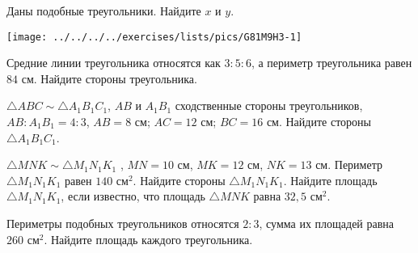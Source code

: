 \begin{homework}[number=3]
	\begin{listofex}
		\item 
		\begin{minipage}[t]{\bodywidth}
			Даны подобные треугольники. Найдите \( x \) и \( y \).
		\end{minipage}
		\hspace{0.02\linewidth}
		\begin{minipage}[t]{\picwidth}
			\texttt{[image: ../../../../exercises/lists/pics/G81M9H3-1]}
		\end{minipage}
		\item Средние линии треугольника относятся как \( 3 : 5 : 6 \), а периметр треугольника равен \( 84 \) см. Найдите стороны треугольника.
		\item \( \triangle ABC \sim \triangle A_1B_1C_1 \), \( AB \) и \( A_1B_1  \) сходственные стороны треугольников, \( AB:A_1B_1=4:3 \), \( AB=8 \) см; \( AC=12 \) см; \( BC=16 \) см. Найдите стороны \( \triangle A_1B_1C_1 \).
		\item \( \triangle MNK \sim \triangle M_1N_1K_1 \) , \( MN=10 \) см, \( MK=12 \) см, \( NK=13 \) см. Периметр \( \triangle M_1N_1K_1 \) равен \( 140 \) см\( ^{2} \). Найдите стороны \( \triangle M_1N_1K_1 \). Найдите площадь \( \triangle M_1N_1K_1 \), если известно, что площадь \( \triangle MNK \) равна \( 32,5 \) см\( ^{2} \).
		\item Периметры подобных треугольников относятся \( 2:3 \), сумма их площадей равна \( 260  \) см\( ^{2} \). Найдите площадь каждого треугольника.
	\end{listofex}
\end{homework}


